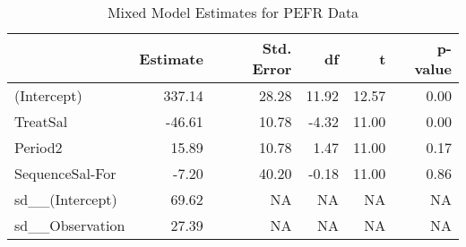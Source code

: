 \begin{table}

\caption{\label{tab:pefrDataEstimates}Mixed Model Estimates for PEFR Data}
\centering
\begin{tabular}[t]{>{}l|rrrrr}
\toprule
 & Estimate & Std. Error & df & t & p-value\\
\midrule
(Intercept) & 337.14 & 28.28 & 11.92 & 12.57 & 0.00\\
TreatSal & -46.61 & 10.78 & -4.32 & 11.00 & 0.00\\
Period2 & 15.89 & 10.78 & 1.47 & 11.00 & 0.17\\
SequenceSal-For & -7.20 & 40.20 & -0.18 & 11.00 & 0.86\\
sd\_\_(Intercept) & 69.62 & NA & NA & NA & NA\\
\addlinespace
sd\_\_Observation & 27.39 & NA & NA & NA & NA\\
\bottomrule
\end{tabular}
\end{table}
